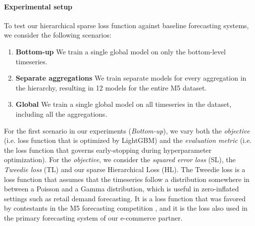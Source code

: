 \documentclass[preprint, 3p, times, twocolumn]{elsarticle}
\begin{document}
  \paragraph{Experimental setup} To test our hierarchical sparse loss function against baseline forecasting systems, we consider the following scenarios:
  \begin{enumerate}
    \item \textbf{Bottom-up} We train a single global model on only the bottom-level timeseries.
    \item \textbf{Separate aggregations} We train separate models for every aggregation in the hierarchy, resulting in 12 models for the entire M5 dataset.
    \item \textbf{Global} We train a single global model on all timeseries in the dataset, including all the aggregations.
  \end{enumerate}
  For the first scenario in our experiments (\textit{Bottom-up}), we vary both the \textit{objective} (i.e. loss function that is optimized by LightGBM) and the \textit{evaluation metric} (i.e. the loss function that governs early-stopping during hyperparameter optimization). For the \textit{objective}, we consider the \textit{squared error loss} (SL), the \textit{Tweedie loss} (TL) and our sparse Hierarchical Loss (HL). The Tweedie loss is a loss function that assumes that the timeseries follow a distribution somewhere in between a Poisson and a Gamma distribution, which is useful in zero-inflated settings such as retail demand forecasting. It is a loss function that was favored by contestants in the M5 forecasting competition \cite{januschowski_forecasting_2022}, and it is the loss also used in the primary forecasting system of our e-commerce partner.
\end{document}
